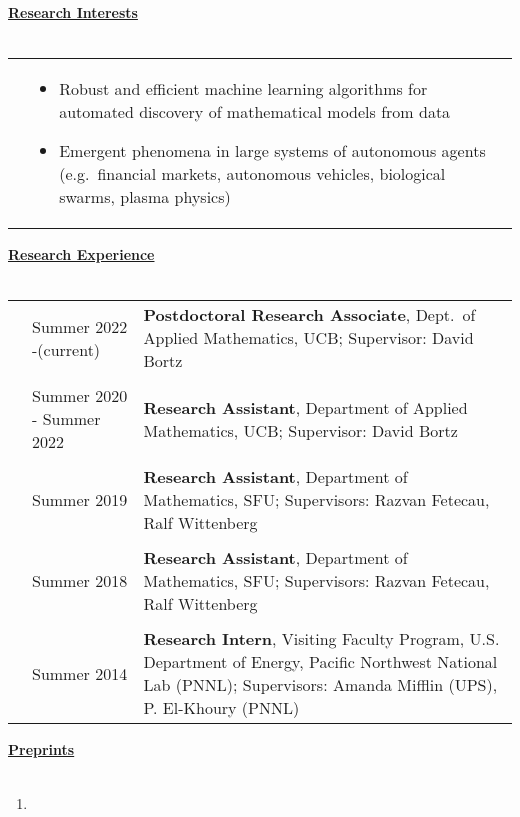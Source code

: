 \documentclass[letterpaper,11pt,oneside]{article}
\newcommand{\headr}[1]{\vspace{10pt}\uline{\Large{\textbf{#1}} \hfill } \\ \vspace{-10pt}\\}
\begin{document}
\headr{Research Interests}
%
\begin{tabular}{@{} p{0.01cm} p{15cm}}
&\begin{itemize}
\item Robust and efficient machine learning algorithms for automated discovery of mathematical models from data
\item Emergent phenomena in large systems of autonomous agents (e.g.\ financial markets, autonomous vehicles, biological swarms, plasma physics) 
\end{itemize}
\end{tabular}

\headr{Research Experience}

\begin{tabular}{@{} p{0.01cm} p{2.5cm} p{12cm}}
& Summer 2022 -\newline (current)  & 
\textbf{Postdoctoral Research Associate}, Dept.\ of Applied Mathematics, UCB;
Supervisor: David Bortz \\
& & \\
& Summer 2020 - \newline Summer 2022  & 
\textbf{Research Assistant}, Department of Applied Mathematics, UCB; \newline
Supervisor: David Bortz \\
&     & \\
& Summer 2019  & 
\textbf{Research Assistant}, Department of Mathematics, SFU;
\newline Supervisors: Razvan Fetecau, Ralf Wittenberg \\
&     & \\
& Summer 2018  & 
\textbf{Research Assistant}, Department of Mathematics, SFU;
\newline Supervisors: Razvan Fetecau, Ralf Wittenberg \\
&     & \\
& Summer 2014  & 
\textbf{Research Intern},  Visiting Faculty Program, U.S. Department of Energy, Pacific Northwest National Lab (PNNL);
\newline Supervisors: Amanda Mifflin (UPS), P. El-Khoury (PNNL) 
\end{tabular}




\headr{Preprints}
\begin{enumerate}
\item {}
\end{enumerate}
\end{document}
